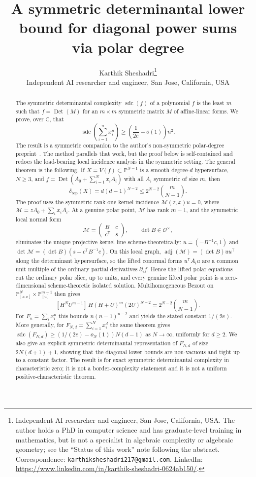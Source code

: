 \documentclass[11pt]{article}
\title{\bf A symmetric determinantal lower bound for diagonal power sums\\
via polar degree}
\author{%
  Karthik Sheshadri\thanks{Independent AI researcher and engineer, San Jose,
  California, USA. The author holds a PhD in computer science and has
  graduate-level training in mathematics, but is not a specialist in algebraic
  complexity or algebraic geometry; see the ``Status of this work'' note
  following the abstract. Correspondence:
  \texttt{karthiksheshadri217@gmail.com}. LinkedIn:
  \url{https://www.linkedin.com/in/karthik-sheshadri-0624ab150/}.}
  \\[4pt]
  \small Independent AI researcher and engineer, San Jose, California, USA
}
\date{}
\theoremstyle{plain}
\theoremstyle{definition}
\DeclareMathOperator{\sdc}{sdc}
\DeclareMathOperator{\adj}{adj}
\DeclareMathOperator{\Det}{Det}
\newcommand{\PP}{\mathbb{P}}
\newcommand{\CC}{\mathbb{C}}
\newcommand{\OO}{\mathcal O}
\newcommand{\Mcal}{\mathcal M}
\newcommand{\pdeg}{\delta}
\begin{document}
\maketitle

\begin{abstract}
The symmetric determinantal complexity $\sdc(f)$ of a polynomial $f$ is the
least $m$ such that $f=\Det(M)$ for an $m\times m$ symmetric matrix $M$ of
affine-linear forms.  We prove, over $\CC$, that
\[
  \sdc\!\left(\sum_{i=1}^n x_i^n\right)
  \ge \left(\frac{1}{2e}-o(1)\right)n^2 .
\]
The result is a symmetric companion to the author's non-symmetric polar-degree
preprint~\cite{SheshadriArxiv}.  The method parallels that work, but the proof
below is self-contained and redoes the load-bearing local incidence analysis in
the symmetric setting.  The general theorem is the following.  If
$X=V(f)\subset\PP^{N-1}$ is a smooth degree-$d$ hypersurface, $N\ge3$, and
$f=\Det(A_0+\sum_{i=1}^N x_iA_i)$ with all $A_i$ symmetric of size $m$, then
\[
  \pdeg_{\mathrm{top}}(X)=d(d-1)^{N-2}
  \le 2^{N-2}\binom{m}{N-1}.
\]
The proof uses the symmetric rank-one kernel incidence
$\Mcal(z,x)u=0$, where $\Mcal=zA_0+\sum_i x_iA_i$.  At a genuine polar point,
$\Mcal$ has rank $m-1$, and the symmetric local normal form
\[
  \Mcal=\begin{pmatrix}B&c\\ c^{\mathsf T}&s\end{pmatrix},\qquad
  \det B\in\OO^\times,
\]
eliminates the unique projective kernel line scheme-theoretically:
$u=(-B^{-1}c,1)$ and $\det\Mcal=(\det B)(s-c^{\mathsf T}B^{-1}c)$.  On this
local graph, $\adj(\Mcal)=(\det B)uu^{\mathsf T}$ along the determinant
hypersurface, so the lifted conormal forms $u^{\mathsf T}A_i u$ are a common
unit multiple of the ordinary partial derivatives $\partial_i f$.  Hence the
lifted polar equations cut the ordinary polar slice, up to units, and every
genuine lifted polar point is a zero-dimensional scheme-theoretic isolated
solution.  Multihomogeneous Bezout on
$\PP^N_{[z:x]}\times\PP^{m-1}_{[u]}$ then gives
\[
  [H^N U^{m-1}]\,H(H+U)^m(2U)^{N-2}
  =2^{N-2}\binom{m}{N-1}.
\]
For $F_n=\sum_i x_i^n$ this bounds $n(n-1)^{n-2}$ and yields the stated
constant $1/(2e)$.  More generally, for
$F_{N,d}=\sum_{i=1}^N x_i^d$ the same theorem gives
$\sdc(F_{N,d})\ge(1/(2e)-o_N(1))N(d-1)$ as $N\to\infty$, uniformly for
$d\ge2$.  We also give an explicit symmetric determinantal representation of
$F_{N,d}$ of size $2N(d+1)+1$, showing that the diagonal lower bounds are
non-vacuous and tight up to a constant factor.  The result is for exact
symmetric determinantal complexity in characteristic zero; it is not a
border-complexity statement and it is not a uniform positive-characteristic
theorem.
\end{abstract}
\end{document}

